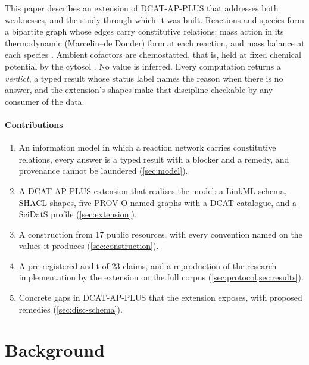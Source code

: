 \documentclass[5p]{elsarticle}
\theoremstyle{definition}
\theoremstyle{plain}
\begin{document}
This paper describes an extension of DCAT-AP-PLUS that addresses both weaknesses, and the study through which it was built.
Reactions and species form a bipartite graph whose edges carry constitutive relations: mass action in its thermodynamic (Marcelin--de Donder) form at each reaction, and mass balance at each species \citep{kondepudi1998modern,gawthrop2014bond}.
Ambient cofactors are chemostatted, that is, held at fixed chemical potential by the cytosol \citep{polettini2014irreversible,rao2016nonequilibrium}.
No value is inferred.
Every computation returns a \emph{verdict}, a typed result whose status label names the reason when there is no answer, and the extension's shapes make that discipline checkable by any consumer of the data.

\paragraph{Contributions}
\begin{enumerate}[leftmargin=*,itemsep=1pt,topsep=2pt]
  \item An information model in which a reaction network carries constitutive relations, every answer is a typed result with a blocker and a remedy, and provenance cannot be laundered (\cref{sec:model}).
  \item A DCAT-AP-PLUS extension that realises the model: a LinkML schema, SHACL shapes, five PROV-O named graphs with a DCAT catalogue, and a SciDatS profile (\cref{sec:extension}).
  \item A construction from 17 public resources, with every convention named on the values it produces (\cref{sec:construction}).
  \item A pre-registered audit of 23 claims, and a reproduction of the research implementation by the extension on the full corpus (\cref{sec:protocol,sec:results}).
  \item Concrete gaps in DCAT-AP-PLUS that the extension exposes, with proposed remedies (\cref{sec:disc-schema}).
\end{enumerate}

\section{Background}
\label{sec:related}
\end{document}
